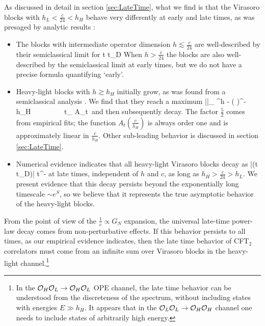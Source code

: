As discussed in detail in section \ref{sec:LateTime}, what we find is that the Virasoro blocks with $h_L < \frac{c}{24} < h_H$ behave very differently at early and late times, as was presaged by analytic results \cite{Fitzpatrick:2016ive}:
\begin{itemize}
\item The blocks with intermediate operator dimension $h \lesssim \frac{c}{24}$ are well-described by their semiclassical limit \cite{Fitzpatrick:2014vua, Fitzpatrick:2015zha, Fitzpatrick:2016mjq} for
\be
t \lesssim t_D \equiv {}
\ee 
When $h > \frac{c}{24}$ the blocks are also well-described by the semiclassical limit at early times, but we do not have a precise formula quantifying `early'.
\item  Heavy-light blocks with $h \gtrsim h_H$ initially grow, as was found from a semiclassical analysis \cite{Fitzpatrick:2016mjq}.  We find that they reach a maximum 
\be \label{eq:IntroVmaxtmax}
|\CV|_{\max} ^{h - }  \left(  \right)^{- h_H} \ \ \ \  \ \ \ \ t_{\max} \approx A_{t}\, 
\ee
and then subsequently decay. The factor $\frac{5}{2}$ comes from empirical fits; the function $A_{t}(\frac{c}{h_H})$ is always order one and is approximately linear in $\frac{c}{h_H}$.  Other sub-leading behavior is discussed in section \ref{sec:LateTime}.
\item Numerical evidence indicates that all heavy-light Virasoro blocks decay as
\be
\left|\CV(t \gg t_D)\right| \propto t^{-}
\ee
at late times, independent of $h$ and $c$, as long as $h_H > \frac{c}{24} > h_L$.  We present evidence that this decay persists beyond the exponentially long timescale $\sim e^S$, so we believe that it represents the true asymptotic behavior of the heavy-light blocks.
\end{itemize}
From the point of view of the  $\frac{1}{c} \propto G_N$ expansion, the universal late-time power-law decay comes from non-perturbative effects.  If this behavior persists to all times, as our empirical evidence indicates, then the late time behavior of CFT$_2$ correlators must come from an infinite sum over Virasoro blocks in the heavy-light channel.\footnote{In the ${\cal O}_H {\cal O}_L \to {\cal O}_H {\cal O}_L$ OPE channel, the late time behavior can be understood from the discreteness of the spectrum, without including states with energies $E \gg h_H$.  It appears that in the ${\cal O}_L {\cal O}_L \to {\cal O}_H {\cal O}_H$ channel one needs to include states of arbitrarily high energy.}

